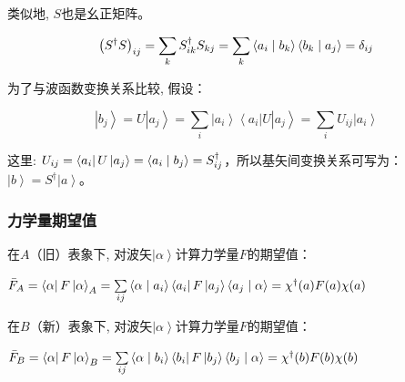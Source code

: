 类似地, $S$也是幺正矩阵。

\begin{equation*}
\left( {S^\dag  S} \right)_{ij}  = \sum\limits_k {S_{ik}^\dag  S_{kj} }  = \sum\limits_k {\left\langle {{a_i }}
 \mathrel{\left | {\vphantom {{a_i } {b_k }}}
 \right. \kern-\nulldelimiterspace}
 {{b_k }} \right\rangle \left\langle {{b_k }}
 \mathrel{\left | {\vphantom {{b_k } {a_j }}}
 \right. \kern-\nulldelimiterspace}
 {{a_j }} \right\rangle }  = \delta _{ij} 
\end{equation*}

为了与波函数变换关系比较, 假设：

\begin{equation*}
\left| {b_j } \right\rangle  =
U\left| {a_j } \right\rangle  = \sum\limits_i {\left| {a_i }
\right\rangle \left\langle {a_i } \right|U\left| {a_j }
\right\rangle }  = \sum\limits_i {U_{ij} \left| {a_i } \right\rangle
} 
\end{equation*}

这里: $U_{ij}  = \left\langle {a_i } \right|U\left| {a_j }
\right\rangle  = \left\langle {{a_i }}
 \mathrel{\left | {\vphantom {{a_i } {b_j }}}
 \right. \kern-\nulldelimiterspace}
 {{b_j }} \right\rangle  = S_{ij}^\dag  $，所以基矢间变换关系可写为：$\left| b \right\rangle = S^{\dagger}
\left| a \right\rangle$。


\subsubsection{力学量期望值}

在$A$（旧）表象下, 对波矢$\left| \alpha
\right\rangle$计算力学量$F$的期望值：

$\bar F_A  = \left\langle \alpha  \right|F\left| \alpha
\right\rangle _A  = \sum\limits_{ij} {\left\langle {\alpha }
 \mathrel{\left | {\vphantom {\alpha  {a_i }}}
 \right. \kern-\nulldelimiterspace}
 {{a_i }} \right\rangle \left\langle {a_i } \right|F\left| {a_j } \right\rangle \left\langle {{a_j }}
 \mathrel{\left | {\vphantom {{a_j } \alpha }}
 \right. \kern-\nulldelimiterspace}
 {\alpha } \right\rangle }  = \chi ^\dag  (a)F(a)\chi (a)$


在$B$（新）表象下, 对波矢$\left| \alpha
\right\rangle$计算力学量$F$的期望值：

$\bar F_B  = \left\langle \alpha  \right|F\left| \alpha
\right\rangle _B  = \sum\limits_{ij} {\left\langle {\alpha }
 \mathrel{\left | {\vphantom {\alpha  {b_i }}}
 \right. \kern-\nulldelimiterspace}
 {{b_i }} \right\rangle \left\langle {b_i } \right|F\left| {b_j } \right\rangle \left\langle {{b_j }}
 \mathrel{\left | {\vphantom {{b_j } \alpha }}
 \right. \kern-\nulldelimiterspace}
 {\alpha } \right\rangle }  = \chi ^\dag  (b)F(b)\chi (b)$

